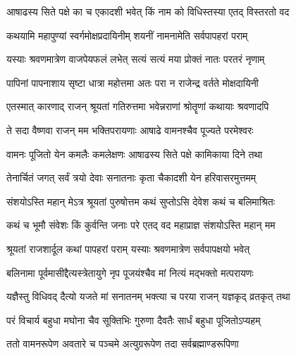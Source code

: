 \label{sec:padma-ashadha-shukla-shayani}

\ganapatyadiDhyanam
\padmaPuranam



\twolineshloka
{आषाढस्य सिते पक्षे का च एकादशी भवेत्}
{किं नाम को विधिस्तस्या एतद् विस्तरतो वद}%


\twolineshloka
{कथयामि महापुण्यां स्वर्गमोक्षप्रदायिनीम्}
{शयनीं नामनामेति सर्वपापहरां पराम्}%

\twolineshloka
{यस्याः श्रवणमात्रेण वाजपेयफलं लभेत्}
{सत्यं सत्यं मया प्रोक्तं नातः परतरं नृणाम्}%

\twolineshloka
{पापिनां पापनाशाय सृष्टा धात्रा महोत्तमा}
{अतः परा न राजेन्द्र वर्तते मोक्षदायिनी}%

\twolineshloka
{एतस्मात् कारणाद् राजन् श्रूयतां गतिरुत्तमा}
{भवेन्नराणां श्रोतॄणां कथायाः श्रवणादपि}%

\twolineshloka
{ते सदा वैष्णवा राजन् मम भक्तिपरायणाः}
{आषाढे वामनश्चैव पूज्यते परमेश्वरः}%

\twolineshloka
{वामनः पूजितो येन कमलैः कमलेक्षणः}
{आषाढस्य सिते पक्षे कामिकाया दिने तथा}%

\twolineshloka
{तेनार्चितं जगत् सर्वं त्रयो देवाः सनातनाः}
{कृता चैकादशी येन हरिवासरमुत्तमम्}%


\twolineshloka
{संशयोऽस्ति महान् मेऽत्र श्रूयतां पुरुषोत्तम}
{कथं सुप्तोऽसि देवेश कथं च बलिमाश्रितः}%

\twolineshloka
{कथं च भूमौ संवेशः किं कुर्वन्ति जनाः परे}
{एतद् वद महाप्राज्ञ संशयोऽस्ति महान् मम}%


\twolineshloka
{श्रूयतां राजशार्दूल कथां पापहरां पराम्}
{यस्याः श्रवणमात्रेण सर्वपापक्षयो भवेत्}%

\twolineshloka
{बलिनामा पूर्वमासीद्दैत्यस्त्रेतायुगे नृप}
{पूजयंश्चैव मां नित्यं मद्भक्तो मत्परायणः}%

\twolineshloka
{यज्ञैस्तु विधिवद् दैत्यो यजते मां सनातनम्}
{भक्त्या च परया राजन् यज्ञकृद् व्रतकृत् तथा}%

\twolineshloka
{परं विचार्य बहुधा मघोना चैव सूक्तिभिः}
{गुरुणा दैवतैः सार्धं बहुधा पूजितोऽप्यहम्}%

\twolineshloka
{ततो वामनरूपेण अवतारे च पञ्चमे}
{अत्युग्ररूपेण तदा सर्वब्रह्माण्डरूपिणा}%

